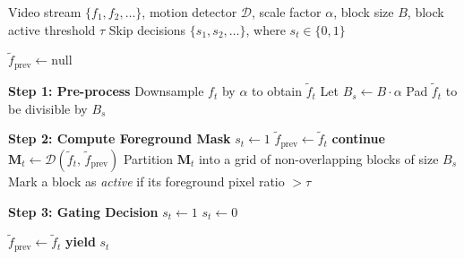 \documentclass{article}
\begin{document}
\begin{preview}

\setcounter{algorithm}{0} %

\begin{algorithm}[H]
    \caption{Skip Module $\mathcal{S}$: Motion-Based Frame Gating}
    \label{alg:skipmodule}
    \begin{algorithmic}[1]

        \Require Video stream $\{f_1, f_2, \dots\}$, motion detector $\mathcal{D}$,
        scale factor $\alpha$, block size $B$, block active threshold $\tau$
        \Ensure Skip decisions $\{s_1, s_2, \dots\}$, where $s_t \in \{0,1\}$

        \State $\tilde{f}_{\text{prev}} \leftarrow \text{null}$ 


        \Statex \hspace{1.5em} \textbf{Step 1: Pre-process}
        \State Downsample $f_t$ by $\alpha$ to obtain $\tilde{f}_t$
        \State Let $B_s \leftarrow B \cdot \alpha$ 
        \State Pad $\tilde{f}_t$ to be divisible by $B_s$

        \Statex \hspace{1.5em} \textbf{Step 2: Compute Foreground Mask}
         
            \State $s_t \leftarrow 1$ 
            \State $\tilde{f}_{\text{prev}} \leftarrow \tilde{f}_t$
            \State \textbf{continue}
        \EndIf
        \State $\mathbf{M}_t \leftarrow \mathcal{D}(\tilde{f}_t,\, \tilde{f}_{\text{prev}})$ 
        \State Partition $\mathbf{M}_t$ into a grid of non-overlapping blocks of size $B_s$
        \State Mark a block as \textit{active} if its foreground pixel ratio $> \tau$

        \Statex \hspace{1.5em} \textbf{Step 3: Gating Decision}
            \State $s_t \leftarrow 1$ 
        \Else
            \State $s_t \leftarrow 0$ 
        \EndIf

        \State $\tilde{f}_{\text{prev}} \leftarrow \tilde{f}_t$ 
        \State \textbf{yield} $s_t$

        \EndFor

    \end{algorithmic}
\end{algorithm}


\end{preview}
\end{document}
